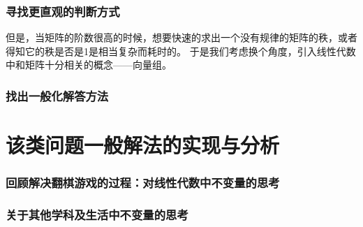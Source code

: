 \documentclass[UTF-8,a4paper]{ctexart}
\begin{document}
\section{寻找更直观的判断方式}
但是，当矩阵的阶数很高的时候，想要快速的求出一个没有规律的矩阵的秩，或者得知它的秩是否是1是相当复杂而耗时的。
于是我们考虑换个角度，引入线性代数中和矩阵十分相关的概念——向量组。
\section{找出一般化解答方法}

\part{该类问题一般解法的实现与分析}
\section{回顾解决翻棋游戏的过程：对线性代数中不变量的思考}
\section{关于其他学科及生活中不变量的思考}
\end{document}
